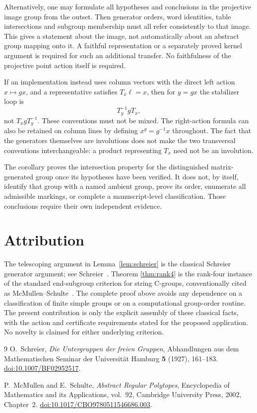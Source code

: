 \documentclass[11pt]{article}
\theoremstyle{remark}
\begin{document}
Alternatively, one may formulate all hypotheses and conclusions in the
projective image group from the outset. Then generator orders, word
identities, table intersections and subgroup membership must all refer
consistently to that image. This gives a statement about the image, not
automatically about an abstract group mapping onto it. A faithful
representation or a separately proved kernel argument is required for
such an additional transfer. No faithfulness of the projective point
action itself is required.

If an implementation instead uses column vectors with the direct left
action $x\mapsto gx$, and a representative satisfies $T_x\ell=x$,
then for $y=gx$ the stabilizer loop is
\[
 T_y^{-1}gT_x,
\]
not $T_xgT_y^{-1}$. These conventions must not be mixed. The right-action
formula can also be retained on column lines by defining
$x^g=g^{-1}x$ throughout. The fact that the generators themselves are
involutions does not make the two transversal conventions interchangeable:
a product representing $T_x$ need not be an involution.

The corollary proves the intersection property for the distinguished
matrix-generated group once its hypotheses have been verified. It does
not, by itself, identify that group with a named ambient group, prove its
order, enumerate all admissible markings, or complete a manuscript-level
classification. Those conclusions require their own independent evidence.

\section*{Attribution}

The telescoping argument in Lemma~\ref{lem:schreier} is the classical
Schreier generator argument; see Schreier~\cite{Schreier}. Theorem
\ref{thm:rank4} is the rank-four instance of the standard end-subgroup
criterion for string C-groups, conventionally cited as
McMullen--Schulte~\cite[Proposition 2E16]{MS}.
The complete proof above avoids any dependence on a classification of
finite simple groups or on a computational group-order routine.
The present contribution is only the explicit assembly of these
classical facts, with the action and certificate requirements stated for
the proposed application. No novelty is claimed for either underlying
criterion.

\begin{thebibliography}{9}
O.~Schreier, \emph{Die Untergruppen der freien Gruppen},
Abhandlungen aus dem Mathematischen Seminar der Universit\"at Hamburg
\textbf{5} (1927), 161--183.
\href{https://doi.org/10.1007/BF02952517}{doi:10.1007/BF02952517}.

P.~McMullen and E.~Schulte, \emph{Abstract Regular Polytopes},
Encyclopedia of Mathematics and its Applications, vol.~92,
Cambridge University Press, 2002, Chapter~2.
\href{https://doi.org/10.1017/CBO9780511546686.003}
{doi:10.1017/CBO9780511546686.003}.
\end{thebibliography}
\end{document}
